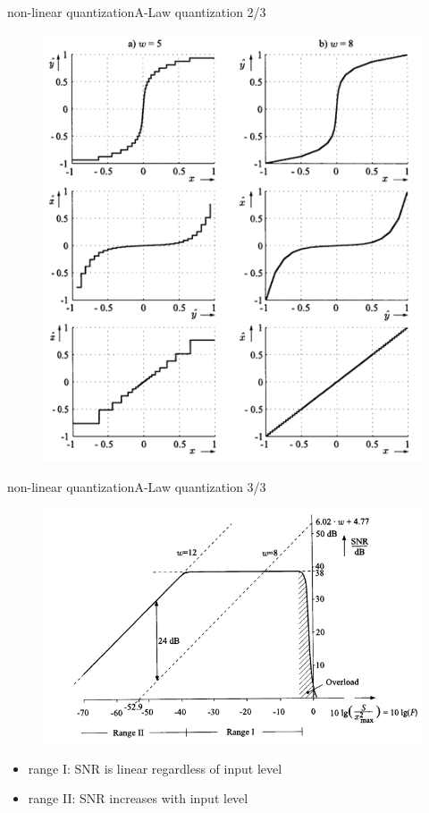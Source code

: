 	\begin{frame}{non-linear quantization}{A-Law quantization 2/3}
        \vspace{-4mm}
	    \begin{figure}
			\centering
				\includegraphics[scale=0.5]{Graph/a-law}
		\end{figure}
	\end{frame}

	\begin{frame}{non-linear quantization}{A-Law quantization 3/3}
	    \vspace{-5mm}
        \begin{figure}
			\centering
				\includegraphics[scale=0.5]{Graph/snr_a-law}
		\end{figure}
        \begin{itemize}
            \item   range I: SNR is linear regardless of input level
            \item   range II: SNR increases with input level
        \end{itemize}
	\end{frame}


